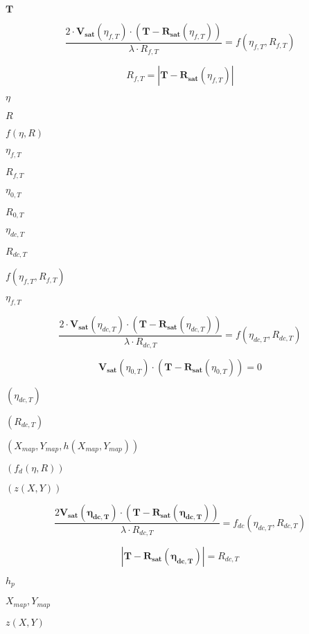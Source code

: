 \documentclass{article}
\begin{document}
$\mathbf{T}$
\pagebreak

\[ \frac{2 \cdot \mathbf{V_{sat}}\left( \eta_{f,T} \right) \cdot \left( \mathbf{T} - \mathbf{R_{sat}}\left(\eta_{f,T}\right) \right)}{\lambda \cdot R_{f,T}} = f\left(\eta_{f,T}, R_{f,T}\right) \]
\pagebreak

\[ R_{f,T} = \left|\mathbf{T} - \mathbf{R_{sat}}\left(\eta_{f,T} \right)\right| \]
\pagebreak

$\eta$
\pagebreak

$R$
\pagebreak

$f\left(\eta,R\right)$
\pagebreak

$\eta_{f,T}$
\pagebreak

$R_{f,T}$
\pagebreak

$\eta_{0,T}$
\pagebreak

$R_{0,T}$
\pagebreak

$\eta_{dc,T}$
\pagebreak

$R_{dc,T}$
\pagebreak

$f\left(\eta_{f,T},R_{f,T}\right)$
\pagebreak

$ \eta_{f,T}$
\pagebreak

\[ \frac{2 \cdot \mathbf{V_{sat}}\left( \eta_{dc,T} \right) \cdot \left( \mathbf{T} - \mathbf{R_{sat}}\left(\eta_{dc,T}\right) \right)}{\lambda \cdot R_{dc,T}} = f\left(\eta_{dc,T}, R_{dc,T}\right) \]
\pagebreak

\[ \mathbf{V_{sat}}\left( \eta_{0,T} \right) \cdot \left( \mathbf{T} - \mathbf{R_{sat}}\left(\eta_{0,T}\right) \right) = 0 \]
\pagebreak

$ \left( \eta_{dc,T} \right) $
\pagebreak

$\left( R_{dc,T}\right) $
\pagebreak

$\left(X_{map}, Y_{map}, h\left(X_{map}, Y_{map}\right)\right)$
\pagebreak

$\left( f_d\left(\eta,R\right)\right)$
\pagebreak

$ \left(z\left( X, Y\right)\right)$
\pagebreak

\[ \frac{2 \mathbf{V_{sat}\left(\eta_{dc,T}\right)} \cdot \left( \mathbf{T} - \mathbf{R_{sat}\left(\eta_{dc,T}\right)} \right)}{\lambda \cdot R_{dc,T}} = f_{dc}\left(\eta_{dc,T}, R_{dc,T} \right) \]
\pagebreak

\[ \left| \mathbf{T} - \mathbf{R_{sat}\left(\eta_{dc,T}\right)} \right | = R_{dc,T} \]
\pagebreak

$h_p$
\pagebreak

$X_{map}, Y_{map}$
\pagebreak

$ z\left(X,Y\right) $
\pagebreak
\end{document}
